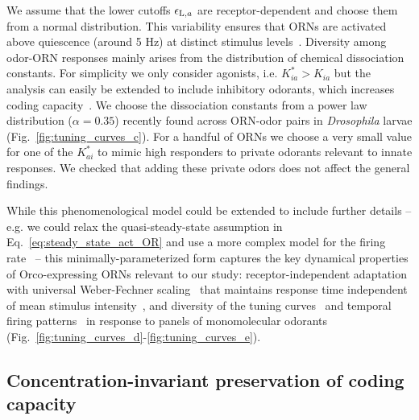 \documentclass[9pt,twocolumn,twoside,lineno]{pnas-new}
\begin{document}
We assume that the lower cutoffs $\epsilon_{\textup{L}, a}$ are receptor-dependent and choose them from a normal distribution. This variability ensures that ORNs are activated above quiescence (around 5 Hz) at distinct stimulus levels~\cite{srinivas_elife}. Diversity among odor-ORN responses mainly arises from the distribution of chemical dissociation constants. For simplicity we only consider agonists, i.e. $K^*_{ia}>K_{ia}$ but the analysis can easily be extended to include inhibitory odorants, which increases coding capacity~\cite{Cao_Tu_WL}. We choose the dissociation constants from a power law distribution ($\alpha = 0.35$) recently found across ORN-odor pairs in \textit{Drosophila} larvae (Fig.~\ref{fig:tuning_curves_c}). For a handful of ORNs we choose a very small value for one of the $K^*_{ai}$ to mimic high responders to private odorants relevant to innate responses. We checked that adding these private odors does not affect the general findings. 
 
While this phenomenological model could be extended to include further details -- e.g. we could relax the quasi-steady-state assumption in Eq.~\ref{eq:steady_state_act_OR} and use a more complex model for the firing rate~\cite{srinivas_elife} -- this minimally-parameterized form captures the key dynamical properties of Orco-expressing ORNs relevant to our study: receptor-independent adaptation~\cite{nagel_wilson_biophysical} with universal Weber-Fechner scaling~\cite{srinivas_elife,cafaro_WL,cao_WL,si2017invariances} that maintains response time independent of mean stimulus intensity~\cite{martelli,srinivas_elife}, and diversity of the tuning curves~\cite{hallem_carlson} and temporal firing patterns~\cite{stopfer_nat_neuro,stopfer_temporal_channel,stopfer_temporal_model} in response to panels of monomolecular odorants (Fig.~\ref{fig:tuning_curves_d}-\ref{fig:tuning_curves_e}). 








\subsection*{Concentration-invariant preservation of coding capacity}%
\end{document}
